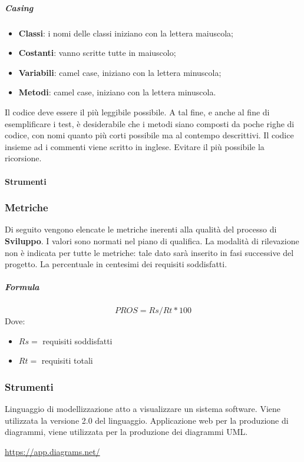 	    \subparagraph{Casing}
	    \begin{itemize}
	        \item \textbf{Classi}: i nomi delle classi iniziano con la lettera maiuscola;
	        \item \textbf{Costanti}: vanno scritte tutte in maiuscolo;
	        \item \textbf{Variabili}: camel case, iniziano con la lettera minuscola;
	        \item \textbf{Metodi}: camel case, iniziano con la lettera minuscola.
	    \end{itemize}
	    Il codice deve essere il più leggibile possibile. A tal fine, e anche al fine di esemplificare i test, è desiderabile che i metodi siano composti da poche righe di codice, con nomi quanto più corti possibile ma al contempo descrittivi.
	    Il codice insieme ad i commenti viene scritto in inglese.
	    Evitare il più possibile la ricorsione.
\paragraph{Strumenti}
        \subsubsection{Metriche}
        Di seguito vengono elencate le metriche inerenti alla qualità del processo di \textbf{Sviluppo}. I valori sono normati nel piano di qualifica. La modalità di rilevazione non è indicata per tutte le metriche: tale dato sarà 
        inserito in fasi successive del progetto.
        La percentuale in centesimi dei requisiti soddisfatti.
        \subparagraph{Formula}
        \begin{displaymath}
         PROS = Rs / Rt *100
        \end{displaymath}
        Dove:
        \begin{itemize}
            \item[] $Rs =$ requisiti soddisfatti
            \item[] $Rt =$ requisiti totali
        \end{itemize}
        
        \subsubsection{Strumenti}
	    Linguaggio di modellizzazione atto a visualizzare un sistema software. Viene utilizzata la versione 2.0 del linguaggio.
	    Applicazione web per la produzione di diagrammi, viene utilizzata per la produzione dei diagrammi UML.\\
	    \centerline{\url{https://app.diagrams.net/}}